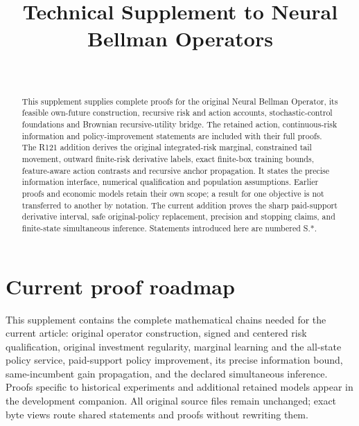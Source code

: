 \documentclass[ecta,nameyear,draft]{econsocart}
\begin{document}
\begin{frontmatter}
\title{Technical Supplement to Neural Bellman Operators}
\begin{aug}
\author[id=au1,addressref={add1}]{~}
\address[id=add1]{Peking University}
\end{aug}
\begin{abstract}This supplement supplies complete proofs for the original Neural Bellman Operator, its feasible own-future construction, recursive risk and action accounts, stochastic-control foundations and Brownian recursive-utility bridge. The retained action, continuous-risk information and policy-improvement statements are included with their full proofs. The R121 addition derives the original integrated-risk marginal, constrained tail movement, outward finite-risk derivative labels, exact finite-box training bounds, feature-aware action contrasts and recursive anchor propagation. It states the precise information interface, numerical qualification and population assumptions. Earlier proofs and economic models retain their own scope; a result for one objective is not transferred to another by notation. The current addition proves the sharp paid-support derivative interval, safe original-policy replacement, precision and stopping claims, and finite-state simultaneous inference. Statements introduced here are numbered S.*. \end{abstract}
\end{frontmatter}
\section{Current proof roadmap}
This supplement contains the complete mathematical chains needed for the
current article: original operator construction, signed and centered risk
qualification, original investment regularity, marginal learning and the
all-state policy service, paid-support policy improvement, its precise
information bound, same-incumbent gain propagation, and the declared simultaneous inference. Proofs specific
to historical experiments and additional retained models appear in the
development companion. All original source files remain unchanged; exact
byte views route shared statements and proofs without rewriting them.




\end{document}
